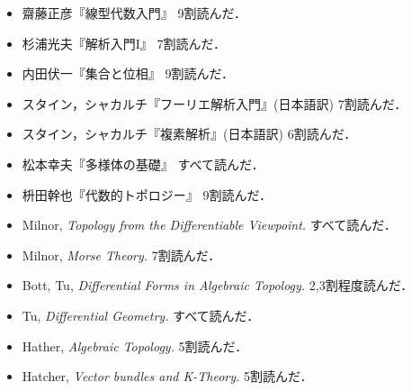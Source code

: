\documentclass[dvipdfmx,uplatex]{jsarticle}
\begin{document}
\begin{itemize}
    \item 齋藤正彦『線型代数入門』 9割読んだ．
    \item 杉浦光夫『解析入門I』 7割読んだ．
    \item 内田伏一『集合と位相』 9割読んだ．
    \item スタイン，シャカルチ『フーリエ解析入門』(日本語訳) 7割読んだ．
    \item スタイン，シャカルチ『複素解析』(日本語訳) 6割読んだ．
    \item 松本幸夫『多様体の基礎』 すべて読んだ．
    \item 枡田幹也『代数的トポロジー』 9割読んだ．
    \item Milnor, \textit{Topology from the Differentiable Viewpoint.} すべて読んだ．
    \item Milnor, \textit{Morse Theory.} 7割読んだ．
    \item Bott, Tu, \textit{Differential Forms in Algebraic Topology.} 2,3割程度読んだ．
    \item Tu, \textit{Differential Geometry.} すべて読んだ．
    \item Hather, \textit{Algebraic Topology.} 5割読んだ．
    \item Hatcher, \textit{Vector bundles and K-Theory.} 5割読んだ．
\end{itemize}
\end{document}
